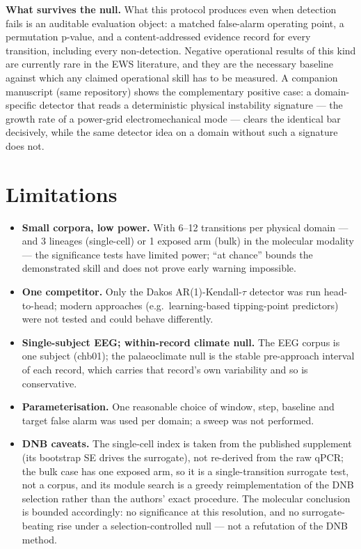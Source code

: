 \documentclass[11pt]{article}
\begin{document}
\textbf{What survives the null.} What this protocol produces even when
detection fails is an auditable evaluation object: a matched
false-alarm operating point, a permutation p-value, and a
content-addressed evidence record for every transition, including every
non-detection. Negative operational results of this kind are currently
rare in the EWS literature, and they are the necessary baseline against
which any claimed operational skill has to be measured. A companion
manuscript (same repository) shows the complementary positive case: a
domain-specific detector that reads a deterministic physical
instability signature --- the growth rate of a power-grid
electromechanical mode --- clears the identical bar decisively, while
the same detector idea on a domain without such a signature does not.

\section{Limitations}\label{sec:limitations}

\begin{itemize}
  \item \textbf{Small corpora, low power.} With 6--12 transitions per
    physical domain --- and 3 lineages (single-cell) or 1 exposed arm
    (bulk) in the molecular modality --- the significance tests have
    limited power; ``at chance'' bounds the demonstrated skill and does
    not prove early warning impossible.
  \item \textbf{One competitor.} Only the Dakos AR(1)-Kendall-$\tau$
    detector was run head-to-head; modern approaches (e.g.\
    learning-based tipping-point predictors) were not tested and could
    behave differently.
  \item \textbf{Single-subject EEG; within-record climate null.} The
    EEG corpus is one subject (chb01); the palaeoclimate null is the
    stable pre-approach interval of each record, which carries that
    record's own variability and so is conservative.
  \item \textbf{Parameterisation.} One reasonable choice of window,
    step, baseline and target false alarm was used per domain; a sweep
    was not performed.
  \item \textbf{DNB caveats.} The single-cell index is taken from the
    published supplement (its bootstrap SE drives the surrogate), not
    re-derived from the raw qPCR; the bulk case has one exposed arm, so
    it is a single-transition surrogate test, not a corpus, and its
    module search is a greedy reimplementation of the DNB selection
    rather than the authors' exact procedure. The molecular conclusion
    is bounded accordingly: no significance at this resolution, and no
    surrogate-beating rise under a selection-controlled null --- not a
    refutation of the DNB method.
\end{itemize}
\end{document}
